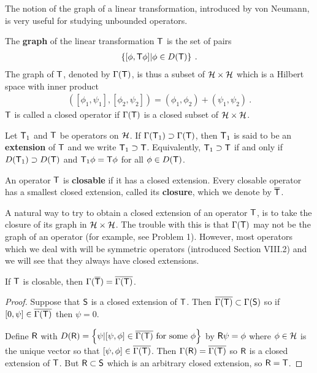 The notion of the graph of a linear transformation, introduced by von Neumann, is very useful for studying unbounded operators.

\begin{definition}
The \textbf{graph} of the linear transformation $\mathsf{T}$ is the set of pairs
\begin{align}
    \left \lbrace [\phi, \mathsf{T} \phi] | \phi \in D(\mathsf{T}) \right \rbrace \:.
\end{align}
The graph of $\mathsf{T}$, denoted by $\Gamma(\mathsf{T})$, is thus a subset of $\mathcal{H} \times \mathcal{H}$ which is a Hilbert space with inner product \begin{align}
    \left([\phi_1, \psi_1], [\phi_2, \psi_2] \right) = (\phi_1, \phi_2) + (\psi_1, \psi_2) \:.
\end{align}
$\mathsf{T}$ is called a closed operator if $\Gamma(\mathsf{T})$ is a closed subset of $\mathcal{H} \times \mathcal{H}$.
\end{definition}

\begin{definition}
    Let $\mathsf{T}_1$ and $\mathsf{T}$ be operators on $\mathcal{H}$. If $\Gamma(\mathsf{T}_1) \supset \Gamma(\mathsf{T})$, then $\mathsf{T}_1$ is said to be an \textbf{extension }of $\mathsf{T}$ and we write $\mathsf{T}_1 \supset \mathsf{T}$. Equivalently, $\mathsf{T}_1 \supset \mathsf{T}$ if and only if $D(\mathsf{T}_1) \supset D(\mathsf{T})$ and $\mathsf{T}_1 \phi = \mathsf{T} \phi$ for all $\phi \in D(\mathsf{T})$.
\end{definition}

\begin{definition}
An operator $\mathsf{T}$ is \textbf{closable} if it has a closed extension. Every closable operator has a smallest closed extension, called its \textbf{closure}, which we denote by $\overline{\mathsf{T}}$.   
\end{definition}


A natural way to try to obtain a closed extension of an operator $\mathsf{T}$, is to take the closure of its graph in $\mathcal{H} \times \mathcal{H}$. The trouble with this is that $\Gamma(\mathsf{T})$ may not be the graph of an operator (for example, see Problem 1). However, most operators which we deal with will be symmetric operators (introduced Section VIII.2) and we will see that they always have closed extensions.

\begin{proposition}
If $\mathsf{T}$ is closable, then $\Gamma(\overline{\mathsf{T}}) = \overline{\Gamma(\mathsf{T})}$.
\end{proposition}

\begin{proof}
Suppose that $\mathsf{S}$ is a closed extension of $\mathsf{T}$. Then $\overline{\Gamma(\mathsf{T})} \subset \Gamma(\mathsf{S})$ so if $[0, \psi] \in \overline{\Gamma(\mathsf{T})}$ then $\psi = 0$.  

Define $\mathsf{R}$ with $D(\mathsf{R}) = \left \lbrace \psi | [\psi, \phi] \in \overline{\Gamma(\mathsf{T})} \text{ for some } \phi \right \rbrace$ by $\mathsf{R} \psi = \phi$ where $\phi \in \mathcal{H}$ is the unique vector so that $[\psi, \phi] \in \overline{\Gamma(\mathsf{T})}$. Then
$\Gamma(\mathsf{R}) = \overline{\Gamma(\mathsf{T})}$ so $\mathsf{R}$ is a closed extension of $\mathsf{T}$. But $\mathsf{R} \subset \mathsf{S}$ which is an arbitrary
closed extension, so $\mathsf{R}= \mathsf{T}$.
\end{proof}

